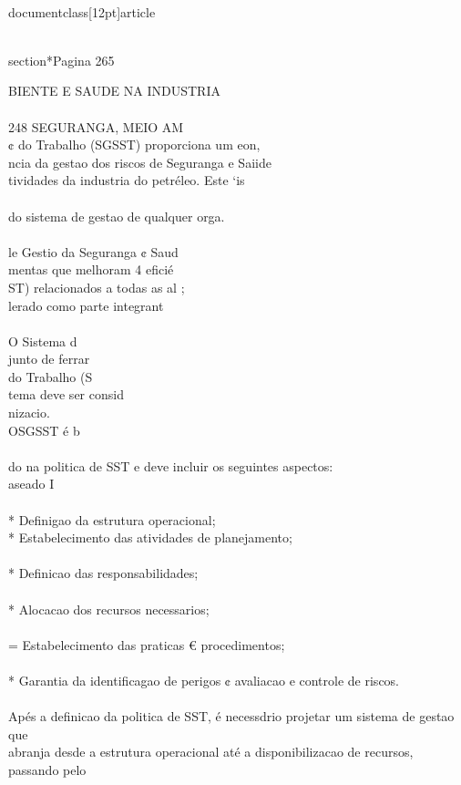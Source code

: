 \\documentclass[12pt]{article}
\begin{document}
{{{{{\\section*{Pagina 265}

BIENTE E SAUDE NA INDUSTRIA\\
\\
248 SEGURANGA, MEIO AM\\
¢ do Trabalho (SGSST) proporciona um eon,\\
ncia da gestao dos riscos de Seguranga e Saiide\\
tividades da industria do petréleo. Este ‘is\\
\\
do sistema de gestao de qualquer orga.\\
\\
le Gestio da Seguranga ¢ Saud\\
mentas que melhoram 4 eficié\\
ST) relacionados a todas as al ;\\
lerado como parte integrant\\
\\
O Sistema d\\
junto de ferrar\\
do Trabalho (S\\
tema deve ser consid\\
nizacio.\\
OSGSST é b\\
\\
do na politica de SST e deve incluir os seguintes aspectos:\\
aseado I\\
\\
* Definigao da estrutura operacional;\\
* Estabelecimento das atividades de planejamento;\\
\\
* Definicao das responsabilidades;\\
\\
* Alocacao dos recursos necessarios;\\
\\
= Estabelecimento das praticas € procedimentos;\\
\\
* Garantia da identificagao de perigos ¢ avaliacao e controle de riscos.\\
\\
Apés a definicao da politica de SST, é necessdrio projetar um sistema de gestao que\\
abranja desde a estrutura operacional até a disponibilizacao de recursos, passando pelo\\
}}}}}
\end{document}
